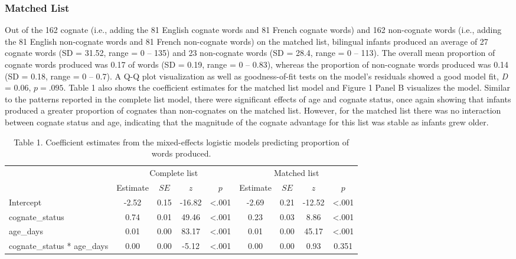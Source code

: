 \documentclass[
  ,man,floatsintext]{apa6}
\begin{document}
\hypertarget{matched-list}{%
\subsubsection{Matched List}\label{matched-list}}

Out of the 162 cognate (i.e., adding the 81 English cognate words and 81 French cognate words) and 162 non-cognate words (i.e., adding the 81 English non-cognate words and 81 French non-cognate words) on the matched list, bilingual infants produced an average of 27 cognate words (SD = 31.52, range = 0 -- 135) and 23 non-cognate words (SD = 28.4, range = 0 -- 113). The overall mean proportion of cognate words produced was 0.17 of words (SD = 0.19, range = 0 -- 0.83), whereas the proportion of non-cognate words produced was 0.14 (SD = 0.18, range = 0 -- 0.7). A Q-Q plot visualization as well as goodness-of-fit tests on the model's residuals showed a good model fit, \emph{D} = 0.06, \(p = .095\). Table 1 also shows the coefficient estimates for the matched list model and Figure 1 Panel B visualizes the model. Similar to the patterns reported in the complete list model, there were significant effects of age and cognate status, once again showing that infants produced a greater proportion of cognates than non-cognates on the matched list. However, for the matched list there was no interaction between cognate status and age, indicating that the magnitude of the cognate advantage for this list was stable as infants grew older.

\begin{table}[H]

\begin{center}
\begin{threeparttable}

\caption{\label{tab:Table 1}Table 1. Coefficient estimates from the mixed-effects logistic models predicting proportion of words produced.}

\begin{tabular}{lcccccccc}
\toprule
 & \multicolumn{4}{c}{Complete list} & \multicolumn{4}{c}{Matched list} \\
\cmidrule(r){2-5} \cmidrule(r){6-9}
 & Estimate & $SE$ & $z$ & $p$ & Estimate & $SE$ & $z$ & $p$\\
\midrule
Intercept & -2.52 & 0.15 & -16.82 & <.001 & -2.69 & 0.21 & -12.52 & <.001\\
cognate\_status & 0.74 & 0.01 & 49.46 & <.001 & 0.23 & 0.03 & 8.86 & <.001\\
age\_days & 0.01 & 0.00 & 83.17 & <.001 & 0.01 & 0.00 & 45.17 & <.001\\
cognate\_status * age\_days & 0.00 & 0.00 & -5.12 & <.001 & 0.00 & 0.00 & 0.93 & 0.351\\
\bottomrule
\end{tabular}

\end{threeparttable}
\end{center}

\end{table}
\end{document}
